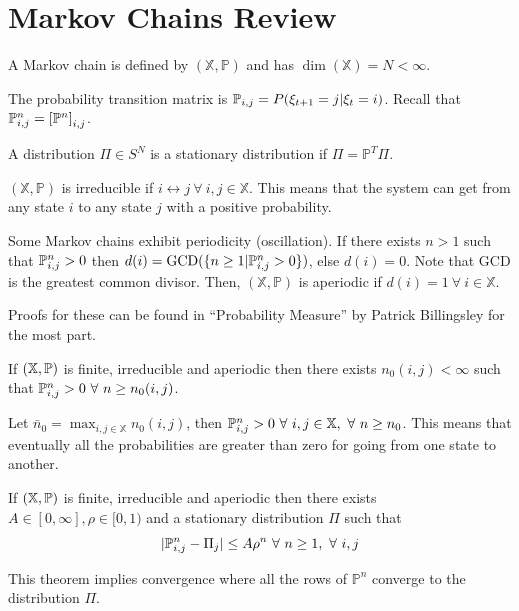 \mainmatter%
\setcounter{page}{1}

\lectureseries[\course]{\course}

\date{October 29, 2009}

\setaddress%

\setcounter{lecture}{9}
\setcounter{chapter}{9}


\section{Markov Chains Review}
A Markov chain is defined by $(\mathbb{X},\mathbb{P})$ and has $\dim(\mathbb{X})=N<\infty$.

The probability transition matrix is $\mathbb{P}_{i,j}=P(\xi_{t+1}=j|\xi_t=i)$.
Recall that $\mathbb{P}_{i,j}^n={[\mathbb{P}^n]}_{i,j}$.

A distribution $\Pi\in S^N$ is a stationary distribution if $\Pi=\mathbb{P}^T\Pi$.

$(\mathbb{X},\mathbb{P})$ is irreducible if $i\leftrightarrow j~\forall~i,j\in\mathbb{X}$.
This means that the system can get from any state $i$ to any state $j$ with a positive probability.

Some Markov chains exhibit periodicity (oscillation).
If there exists $n>1$ such that $\mathbb{P}_{i,j}^n>0$ then $d(i)=\text{GCD}(\{n\geq1|\mathbb{P}_{i,j}^n>0\})$, else $d(i)=0$.
Note that $\text{GCD}$ is the greatest common divisor.
Then, $(\mathbb{X},\mathbb{P})$ is aperiodic if $d(i)=1~\forall~i\in\mathbb{X}$.

Proofs for these can be found in ``Probability Measure'' by Patrick Billingsley for the most part.

\begin{lemma}
If $(\mathbb{X},\mathbb{P})$ is finite, irreducible and aperiodic then there exists $n_0(i,j)<\infty$ such that $\mathbb{P}_{i,j}^n>0~\forall~n\geq n_0(i,j)$.
\end{lemma}
Let $\bar{n}_0=\max_{i,j\in\mathbb{X}}n_0(i,j)$, then $\mathbb{P}_{i,j}^n>0~\forall~i,j\in\mathbb{X},~\forall~n\geq n_0$.
This means that eventually all the probabilities are greater than zero for going from one state to another.

\begin{theorem}
\label{th:distconverge}
If $(\mathbb{X},\mathbb{P})$ is finite, irreducible and aperiodic then there exists $A\in[0,\infty], \rho\in[0,1)$ and a stationary distribution $\Pi$ such that%
$$|\mathbb{P}_{i,j}^n-\Pi_j|\leq A\rho^n~\forall~n\geq1,~\forall~i,j$$
\end{theorem}
This theorem implies convergence where all the rows of $\mathbb{P}^n$ converge to the distribution $\Pi$.

